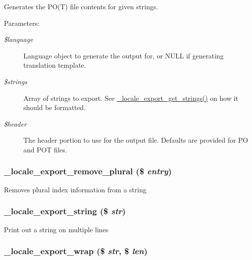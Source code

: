 Generates the PO(T) file contents for given strings.

\begin{Desc}
\item[Parameters:]
\begin{description}
\item[{\em \$language}]Language object to generate the output for, or NULL if generating translation template. \item[{\em \$strings}]Array of strings to export. See \hyperlink{group__locale_gde17be27a5240ba4804dc51eccf40246}{\_\-locale\_\-export\_\-get\_\-strings()} on how it should be formatted. \item[{\em \$header}]The header portion to use for the output file. Defaults are provided for PO and POT files. \end{description}
\end{Desc}
\hypertarget{group__locale_ga18a14faeb8268aee1530afb6b03cca1}{
\subsubsection[{\_\-locale\_\-export\_\-remove\_\-plural}]{\setlength{\rightskip}{0pt plus 5cm}\_\-locale\_\-export\_\-remove\_\-plural (\$ {\em entry})}}
\label{group__locale_ga18a14faeb8268aee1530afb6b03cca1}


Removes plural index information from a string \hypertarget{group__locale_g8203c2c5a4f964da2395889920934fae}{
\subsubsection[{\_\-locale\_\-export\_\-string}]{\setlength{\rightskip}{0pt plus 5cm}\_\-locale\_\-export\_\-string (\$ {\em str})}}
\label{group__locale_g8203c2c5a4f964da2395889920934fae}


Print out a string on multiple lines \hypertarget{group__locale_gae41274b64222185a36a42dbc0ff4b94}{
\subsubsection[{\_\-locale\_\-export\_\-wrap}]{\setlength{\rightskip}{0pt plus 5cm}\_\-locale\_\-export\_\-wrap (\$ {\em str}, \/  \$ {\em len})}}
\label{group__locale_gae41274b64222185a36a42dbc0ff4b94}


